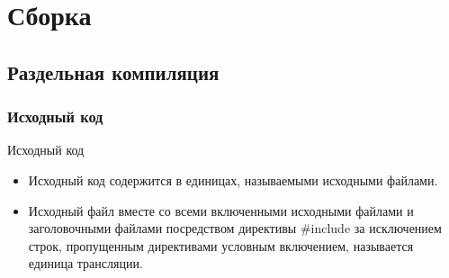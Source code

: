 


    
    \section{Сборка}
    \subsection{Раздельная компиляция}
    \subsubsection{Исходный код}
    \begin{frame}{Исходный код}
        \begin{itemize}
            \item Исходный код содержится в единицах, называемыми исходными файлами.
            \item Исходный файл вместе со всеми включенными исходными файлами и заголовочными файлами посредством директивы \#include
                за исключением строк, пропущенным директивами условным включением, называется единица трансляции.
        \end{itemize}
    \end{frame}
